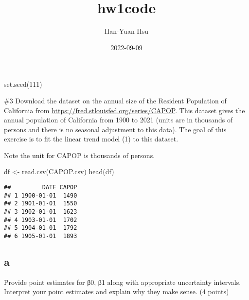 \documentclass[
]{article}
\title{hw1code}
\author{Han-Yuan Hsu}
\date{2022-09-09}
\newenvironment{Shaded}{\begin{snugshade}}{\end{snugshade}}
\newcommand{\CommentTok}[1]{\textcolor[rgb]{0.56,0.35,0.01}{\textit{#1}}}
\newcommand{\DecValTok}[1]{\textcolor[rgb]{0.00,0.00,0.81}{#1}}
\newcommand{\FunctionTok}[1]{\textcolor[rgb]{0.00,0.00,0.00}{#1}}
\newcommand{\NormalTok}[1]{#1}
\newcommand{\OtherTok}[1]{\textcolor[rgb]{0.56,0.35,0.01}{#1}}
\newcommand{\SpecialCharTok}[1]{\textcolor[rgb]{0.00,0.00,0.00}{#1}}
\newcommand{\StringTok}[1]{\textcolor[rgb]{0.31,0.60,0.02}{#1}}
\begin{document}
\maketitle

\begin{Shaded}
\begin{Highlighting}[]
\FunctionTok{set.seed}\NormalTok{(}\DecValTok{111}\NormalTok{)}
\end{Highlighting}
\end{Shaded}

\#3 Download the dataset on the annual size of the Resident Population
of California from \url{https://fred.stlouisfed.org/series/CAPOP}. This
dataset gives the annual population of California from 1900 to 2021
(units are in thousands of persons and there is no seasonal adjustment
to this data). The goal of this exercise is to fit the linear trend
model (1) to this dataset.

Note the unit for CAPOP is thousands of persons.

\begin{Shaded}
\begin{Highlighting}[]
\NormalTok{df }\OtherTok{\textless{}{-}} \FunctionTok{read.csv}\NormalTok{(}\StringTok{\textquotesingle{}CAPOP.csv\textquotesingle{}}\NormalTok{)}
\FunctionTok{head}\NormalTok{(df)}
\end{Highlighting}
\end{Shaded}

\begin{verbatim}
##         DATE CAPOP
## 1 1900-01-01  1490
## 2 1901-01-01  1550
## 3 1902-01-01  1623
## 4 1903-01-01  1702
## 5 1904-01-01  1792
## 6 1905-01-01  1893
\end{verbatim}

\begin{Shaded}
\end{Shaded}

\hypertarget{a}{%
\subsection{a}\label{a}}

Provide point estimates for β0, β1 along with appropriate uncertainty
intervals. Interpret your point estimates and explain why they make
sense. (4 points)
\end{document}
